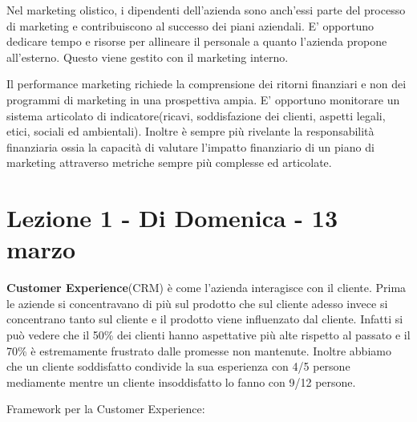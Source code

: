 \documentclass[11pt]{article}
\begin{document}
Nel marketing olistico, i dipendenti dell'azienda sono anch'essi parte del processo di marketing e contribuiscono al successo dei piani aziendali. 
E' opportuno dedicare tempo e risorse per allineare il personale a quanto l'azienda propone all'esterno. Questo viene gestito con il marketing interno.

Il performance marketing richiede la comprensione dei ritorni finanziari e non dei programmi di marketing in una prospettiva ampia. 
E' opportuno monitorare un sistema articolato di indicatore(ricavi, soddisfazione dei clienti, aspetti legali, etici, sociali ed ambientali). 
Inoltre è sempre più rivelante la responsabilità finanziaria ossia la capacità di valutare l'impatto finanziario di un piano di marketing attraverso metriche sempre più complesse ed articolate.

\section{Lezione 1 - Di Domenica - 13 marzo} 
\textbf{Customer Experience}(CRM) è come l'azienda interagisce con il cliente. Prima le aziende si concentravano di più sul prodotto che sul cliente adesso invece si concentrano tanto sul cliente e il prodotto viene influenzato dal cliente. Infatti si può vedere che il 50\% dei clienti hanno aspettative più alte rispetto al passato e il 70\% è estremamente frustrato dalle promesse non mantenute. Inoltre abbiamo che un cliente soddisfatto condivide la sua esperienza con 4/5 persone mediamente mentre un cliente insoddisfatto lo fanno con 9/12 persone.

Framework per la Customer Experience:
\end{document}
